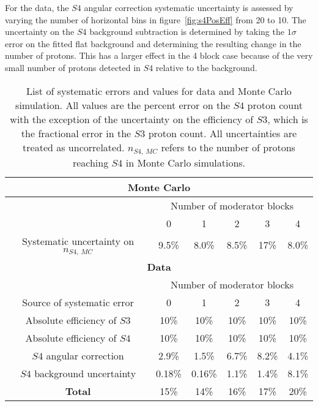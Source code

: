 For the data, the $\mathit{S4}$ angular correction systematic uncertainty is assessed by varying the number of horizontal bins in figure~\ref{fig:s4PosEff} from 20 to 10.
The uncertainty on the $\mathit{S4}$ background subtraction is determined by taking the $1\sigma$ error on the fitted flat background and determining the resulting change in the number of protons.
This has a larger effect in the 4 block case because of the very small number of protons detected in $\mathit{S4}$ relative to the background.

\begin{table}
	\centering
	\caption{List of systematic errors and values for data and Monte Carlo simulation. All values are the percent error on the $\mathit{S4}$ proton count with the exception of the uncertainty on the efficiency of $\mathit{S3}$, which is the fractional error in the $\mathit{S3}$ proton count. All uncertainties are treated as uncorrelated. $n_{\mathit{S4},~MC}$ refers to the number of protons reaching $\mathit{S4}$ in Monte Carlo simulations.}
	\begin{tabular}{|c|c c c c c|}
		\hline 
		\multicolumn{6}{|c|}{\textbf{Monte Carlo}} \\
		\hline
		& \multicolumn{5}{c|}{Number of moderator blocks} \\
		& 0 & 1 & 2 & 3 & 4 \\
		\hline
		Systematic uncertainty on $n_{\mathit{S4},~MC}$ & 9.5\% & 8.0\% & 8.5\% & 17\% & 8.0\% \\
		\hline
		\hline
		\multicolumn{6}{|c|}{\textbf{Data}} \\
		\hline
		& \multicolumn{5}{c|}{Number of moderator blocks} \\
		Source of systematic error & 0 & 1 & 2 & 3 & 4 \\
		\hline
		Absolute efficiency of $\mathit{S3}$ & 10\% & 10\% & 10\% & 10\% & 10\% \\
		Absolute efficiency of $\mathit{S4}$ & 10\% & 10\% & 10\% & 10\% & 10\% \\ 
		$\mathit{S4}$ angular correction & 2.9\% & 1.5\% & 6.7\% & 8.2\% & 4.1\% \\
		$\mathit{S4}$ background uncertainty & 0.18\% & 0.16\% & 1.1\% & 1.4\% & 8.1\% \\
		\hline
		\textbf{Total} & 15\% & 14\% & 16\% & 17\% & 20\% \\
		\hline 
	\end{tabular}
	\label{tab:systematics}
\end{table}

